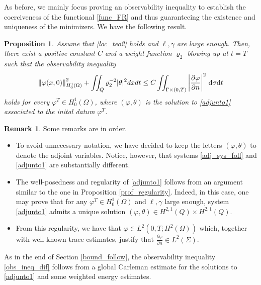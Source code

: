 \documentclass{aims}
\newtheorem{proposition}{Proposition}
\theoremstyle{definition}
\newtheorem{remark}{Remark}
\def\cbd{\Gamma}
\def\dt{\textnormal{d}t}
\def\d{\,\textnormal{d}}
\begin{document}
As before, we mainly focus proving an observability inequality to establish the coerciveness of the functional \eqref{func_FR} and thus guaranteeing the existence and uniqueness of the minimizers. We have the following result.
%
\begin{proposition}\label{prop_obs_ineq_dif}
Assume that \eqref{loc_teo2} holds and $\ell,\gamma$ are large enough.  Then, there exist a positive constant $C$ and a weight function $\varrho_2$ blowing up at $t=T$ such that the observability inequality
%
\begin{equation}\label{obs_ineq_dif}
\left\|\varphi(x,0)\right\|^2_{H_0^1(\Omega)}+\iint_{Q}{\varrho}_2^{-2}|\theta|^2dxdt\leq C\iint_{\cbd \times(0,T)}\left|\frac{\partial \varphi}{\partial n} \right|^2\d\sigma\dt
\end{equation}
%
holds for every $\varphi^T\in H_0^{1}(\Omega)$, where $(\varphi,\theta)$ is the solution to \eqref{adjunto1} associated to the inital datum $\varphi^T$. 
\end{proposition}
%

\begin{remark}
Some remarks are in order.
%
\begin{itemize}
\item To avoid unnecessary notation, we have decided to keep the letters $(\varphi,\theta)$ to denote the adjoint variables. Notice, however, that  systems \eqref{adj_sys_foll} and \eqref{adjunto1} are substantially different. 
\item The well-posedness and regularity of \eqref{adjunto1} follows from an argument similar to the one in Proposition \ref{prof_regularity}. Indeed, in this case, one may prove that for any $\varphi^T\in H_0^1(\Omega)$ and $\ell,\gamma$ large enough, system \eqref{adjunto1} admits a unique solution $(\varphi,\theta)\in H^{2,1}(Q)\times H^{2,1}(Q)$. 
\item From this regularity, we have that $\varphi\in L^2(0,T;H^2(\Omega))$ which, together with well-known trace estimates, justify that $\frac{\partial\varphi}{\partial n}\in L^2(\Sigma)$.
\end{itemize}
%
\end{remark}

As in the end of Section \ref{bound_follow}, the observability inequality \eqref{obs_ineq_dif} follows from a global Carleman estimate for the solutions to \eqref{adjunto1} and some weighted energy estimates. 
\end{document}
